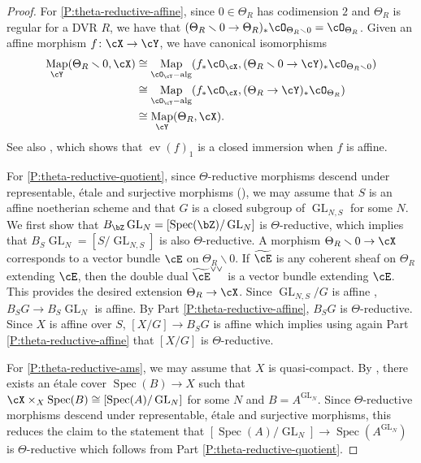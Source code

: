 \documentclass[a4paper]{amsart}
\numberwithin{equation}{section}
\theoremstyle{plain}
\theoremstyle{definition}
\DeclareMathOperator{\Spec}{Spec}
\DeclareMathOperator{\GL}{GL}
\DeclareMathOperator{\ev}{ev}
\newcommand{\co}{\colon}
\newcommand{\oh}{\cO}
\DeclareMathOperator{\Map}{Map}
\begin{document}
\begin{proof}
For \eqref{P:theta-reductive-affine}, since $0 \in \Theta_{R}$ has codimension $2$ and $\Theta_R$ is regular for a DVR $R$, we have that 
$(\Theta_R \smallsetminus 0 \to \Theta_R)_* \oh_{\Theta_R \smallsetminus 0} = \oh_{\Theta_R}$.  Given an affine morphism $f \co \cX \to \cY$,  we have canonical isomorphisms
$$\begin{aligned}
\Map_{\cY} (\Theta_{R} \smallsetminus 0, \cX)   & \cong \Map_{\oh_{\cY}-\text{alg}}(f_* \oh_{\cX}, (\Theta_R \smallsetminus 0 \to \cY)_* \oh_{\Theta_R \smallsetminus 0}) \\
	& \cong \Map_{\oh_{\cY}-\text{alg}}(f_* \oh_{\cX}, (\Theta_R \to \cY)_* \oh_{\Theta_R}) \\
	& \cong \Map_\cY(\Theta_R, \cX).
\end{aligned}$$
See also \cite[Prop.~1.3.2]{hlinstability}, which shows that $\ev(f)_1$ is a closed immersion when $f$ is affine.

For \eqref{P:theta-reductive-quotient}, since $\Theta$-reductive morphisms descend under representable, \'etale and surjective morphisms (), we may assume that $S$ is an affine noetherian scheme and that $G$ is a closed subgroup of $\GL_{N,S}$ for some $N$.  We first show that $B_{\bZ} \GL_{N} = [\Spec(\bZ) / \GL_N]$ is $\Theta$-reductive, which implies that $B_S \GL_{N} = [S/\GL_{N,S}]$ is also $\Theta$-reductive. A morphism $\Theta_R \smallsetminus 0 \to \cX$ corresponds to a vector bundle $\cE$ on $\Theta_R \smallsetminus 0$.  If $\widetilde{\cE}$ is any coherent sheaf on $\Theta_R$ extending $\cE$, then the double dual $\widetilde{\cE}^{\vee \vee}$ is a vector bundle extending $\cE$.  This provides the desired extension $\Theta_R \to \cX$.  Since $\GL_{N,S} / G$ is affine \cite[Thm.~9.4.1]{alper-adequate}, $B_S G \to B_S \GL_N$ is affine.  By Part \eqref{P:theta-reductive-affine}, $B_S G$ is $\Theta$-reductive.  Since $X$ is affine over $S$,  $[X/G] \to B_SG$ is affine which implies using again Part \eqref{P:theta-reductive-affine} that $[X/G]$ is $\Theta$-reductive.

For \eqref{P:theta-reductive-ams}, we may assume that $X$ is quasi-compact. By , 
there exists an \'etale cover $\Spec(B) \to X$ such that $\cX \times_X \Spec(B) \cong [\Spec(A) / \GL_N]$ for some $N$ and $B =A^{\GL_N}$.  Since $\Theta$-reductive morphisms descend under representable, \'etale and surjective morphisms, this reduces the claim to the statement that $[\Spec(A) / \GL_N] \to \Spec(A^{\GL_N})$ is $\Theta$-reductive which follows from Part \eqref{P:theta-reductive-quotient}. 
\end{proof}
\end{document}
